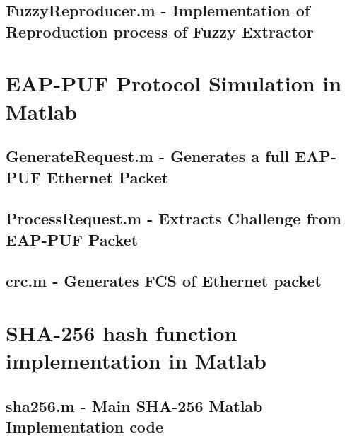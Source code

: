 \subsection{FuzzyReproducer.m - Implementation of Reproduction process of Fuzzy Extractor}



\newpage

\section{EAP-PUF Protocol Simulation in Matlab}
\label{app:eappuf}

\subsection{GenerateRequest.m - Generates a full EAP-PUF Ethernet Packet}



\subsection{ProcessRequest.m - Extracts Challenge from EAP-PUF Packet}



\subsection{crc.m - Generates FCS of Ethernet packet}




\newpage

\section{SHA-256 hash function implementation in Matlab}
\label{app:sha256}

\subsection{sha256.m - Main SHA-256 Matlab Implementation code}



